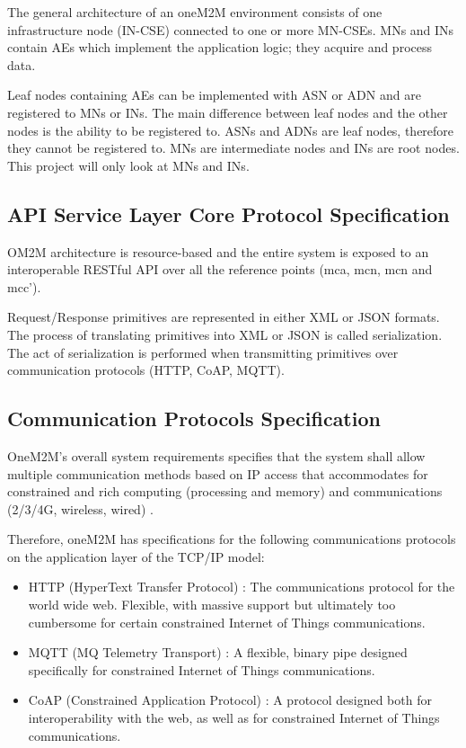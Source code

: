 The general architecture of an oneM2M environment consists of one infrastructure node (IN-CSE) connected to one or more MN-CSEs. MNs and INs contain AEs which implement the application logic; they acquire and process data.

Leaf nodes containing AEs can be implemented with ASN or ADN and are registered to MNs or INs. The main difference between leaf nodes and the other nodes is the ability to be registered to. ASNs and ADNs are leaf nodes, therefore they cannot be registered to. MNs are intermediate nodes and INs are root nodes. This project will only look at MNs and INs.  

\subsection{API Service Layer Core Protocol Specification}

OM2M architecture is resource-based and the entire system is exposed to an interoperable RESTful API \cite{oneM2M2016OneM2Mservicelayer} over all the reference points (mca, mcn, mcn and mcc'). 

Request/Response primitives are represented in either XML or JSON formats. The process of translating primitives into XML or JSON is called serialization. The act of serialization is performed when transmitting primitives over communication protocols (HTTP, CoAP, MQTT). 

\subsection{Communication Protocols Specification}

OneM2M's overall system requirements specifies that the system shall allow multiple communication methods based on IP access that accommodates for constrained and rich computing (processing and memory) and communications (2/3/4G, wireless, wired) \cite{oneM2M2016OneM2Mservicelayer}.

Therefore, oneM2M has specifications for the following communications protocols on the application layer of the TCP/IP model:

\begin{itemize}
  \item HTTP (HyperText Transfer Protocol) \cite{oneM2M2016OneM2MBindingb}: The communications protocol for the world wide web. Flexible, with massive support but ultimately too cumbersome for certain constrained Internet of Things communications.
  \item MQTT (MQ Telemetry Transport) \cite{oneM2M2016OneM2MBinding}: A flexible, binary pipe designed specifically for constrained Internet of Things communications.
  \item CoAP (Constrained Application Protocol) \cite{oneM2M2015OneM2MBinding}: A protocol designed both for interoperability with the web, as well as for constrained Internet of Things communications.
\end{itemize}

